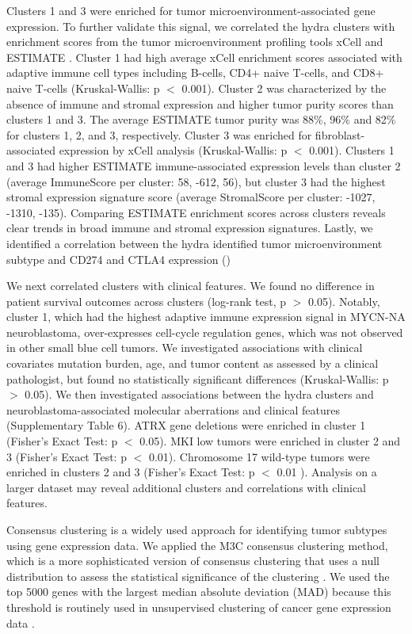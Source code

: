\documentclass[10pt,letterpaper]{article}
\begin{document}
Clusters 1 and 3 were enriched for tumor microenvironment-associated gene expression. To further validate this signal, we correlated the hydra clusters with enrichment scores from the tumor microenvironment profiling tools xCell \cite{aranXCellDigitallyPortraying2017} and ESTIMATE \cite{yoshiharaInferringTumourPurity2013a}. Cluster 1 had high average xCell enrichment scores associated with adaptive immune cell types including B-cells, CD4+ naive T-cells, and CD8+ naive T-cells (Kruskal-Wallis: p $<$ 0.001). Cluster 2 was characterized by the absence of immune and stromal expression and higher tumor purity scores than clusters 1 and 3. The average ESTIMATE tumor purity was 88\%, 96\% and 82\% for clusters 1, 2, and 3, respectively. Cluster 3 was enriched for fibroblast-associated expression by xCell analysis (Kruskal-Wallis: p $<$ 0.001). Clusters 1 and 3 had higher ESTIMATE immune-associated expression levels than cluster 2 (average ImmuneScore per cluster: 58, -612, 56), but cluster 3 had the highest stromal expression signature score (average StromalScore per cluster: -1027, -1310, -135). Comparing ESTIMATE enrichment scores across clusters reveals clear trends in broad immune and stromal expression signatures. Lastly, we identified a correlation between the hydra identified tumor microenvironment subtype and CD274 and CTLA4 expression ()

We next correlated clusters with clinical features. We found no difference in patient survival outcomes across clusters (log-rank test, p $>$ 0.05). Notably, cluster 1, which had the highest adaptive immune expression signal in MYCN-NA neuroblastoma, over-expresses cell-cycle regulation genes, which was not observed in other small blue cell tumors. We investigated associations with clinical covariates mutation burden, age, and tumor content as assessed by a clinical pathologist, but found no statistically significant differences (Kruskal-Wallis: p $>$ 0.05). We then investigated associations between the hydra clusters and neuroblastoma-associated molecular aberrations and clinical features (Supplementary Table 6). ATRX gene deletions were enriched in cluster 1 (Fisher’s Exact Test: p $<$ 0.05). MKI low tumors were enriched in cluster 2 and 3 (Fisher’s Exact Test: p $<$ 0.01). Chromosome 17 wild-type tumors were enriched in clusters 2 and 3 (Fisher’s Exact Test: p $<$ 0.01 ). Analysis on a larger dataset may reveal additional clusters and correlations with clinical features.

Consensus clustering is a widely used approach for identifying tumor subtypes using gene expression data. We applied the M3C consensus clustering method, which is a more sophisticated version of consensus clustering that uses a null distribution to assess the statistical significance of the clustering \cite{johnM3CMonteCarlo2018, wilkersonConsensusClusterPlusClassDiscovery2010a}. We used the top 5000 genes with the largest median absolute deviation (MAD) because this threshold is routinely used in unsupervised clustering of cancer gene expression data \cite{bourgonIndependentFilteringIncreases2010, tritchlerFilteringGenesCluster2009, carcamo-oriveAnalysisTranscriptionalVariability2017}.
\end{document}
